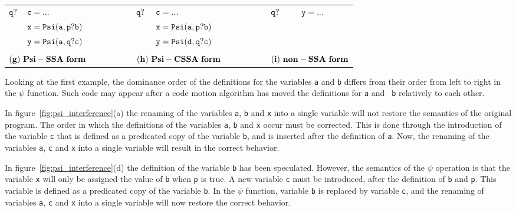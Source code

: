 \begin{figure*}
\begin{center}
\begin{tabular}{llllllll}
${\tt q?}$  & ${\tt c = ...}$ & \ \ \ \ \ \ \ \  & ${\tt q?}$ & ${\tt c = ...}$ & \ \ \ \ \ \ \ \  & ${\tt q?}$ & ${\tt y = ...}$ \\
            & ${\tt x = Psi(a,p?b)}$ & \ \ \ \ \ \ \ \  &     & ${\tt x = Psi(a,p?b)}$  & \ \ \ \ \ \ \ \ &     & \\
            & ${\tt y = Psi(a,q?c)}$ & \ \ \ \ \ \ \ \  &     & ${\tt y = Psi(d,q?c)}$  & \ \ \ \ \ \ \ \ &     & \\
\\
\multicolumn{2}{l}{${\tt {\bf (g)\ Psi-SSA\ form}}$} & \ \ \ \ \ \ \ \  &\multicolumn{2}{l}{${\tt {\bf (h)\ Psi-CSSA\ form}}$} & \ \ \ \ \ \ \ \  &\multicolumn{2}{l}{${\tt {\bf (i)\ non-SSA\ form}}$} \\
\end{tabular}
\caption{$\psi$-SSA, $\psi$-CSSA forms and non-SSA form after destruction}
\label{fig:psi_interference}
\end{center}
\end{figure*}


Looking at the first example, the dominance order of the definitions
for the variables {\tt a} and {\tt b} differs from their order from
left to right in the $\psi$ function. Such code may appear after a
code motion algorithm has moved the definitions for {\tt a} and {\tt
b} relatively to each other.


In figure~\ref{fig:psi_interference}(a) the renaming of the variables
{\tt a}, {\tt b} and {\tt x} into a single variable will not restore
the semantics of the original program. The order in which the
definitions of the variables {\tt a}, {\tt b} and {\tt x} occur must
be corrected. This is done through the introduction of the variable
{\tt c} that is defined as a predicated copy of the variable {\tt b},
and is inserted after the definition of {\tt a}. Now, the renaming of
the variables {\tt a}, {\tt c} and {\tt x} into a single variable will
result in the correct behavior.

In figure~\ref{fig:psi_interference}(d) the definition of the variable
{\tt b} has been speculated. However, the semantics of the $\psi$
operation is that the variable {\tt x} will only be assigned the value
of {\tt b} when {\tt p} is true. A new variable {\tt c} must be
introduced, after the definition of {\tt b} and {\tt p}. This variable
is defined as a predicated copy of the variable {\tt b}. In the
${\psi}$ function, variable {\tt b} is replaced by variable {\tt c},
and the renaming of variables {\tt a}, {\tt c} and {\tt x} into a
single variable will now restore the correct behavior.

